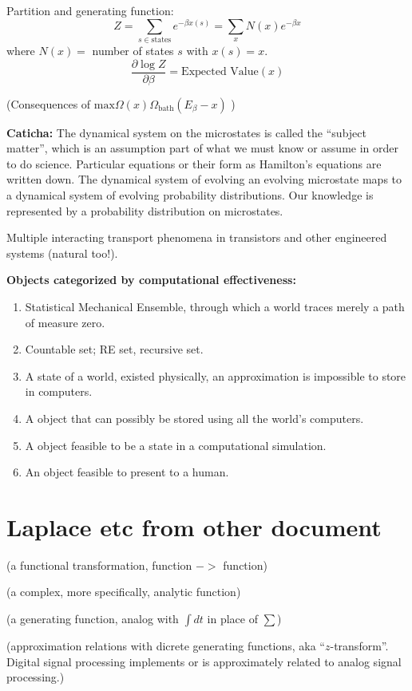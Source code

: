 \documentclass{article}
\begin{document}
Partition and generating function:
\[
Z = \sum_{s\in\text{states}}e^{-\beta x(s)} = \sum_{x}N(x)e^{-\beta x} 
\]
where $N(x)= $ number of states $s$ with $x(s) = x$.
\[
\frac{\partial{\log Z}}{\partial\beta}
=
\text{Expected Value}(x)
\]

(Consequences of $\text{max}\Omega(x)\Omega_{\text{bath}}(E_\beta -x )$
\cite{CatichaEIFP})

\textbf{Caticha:} The dynamical system on the microstates is called
the ``subject matter'', which is an assumption part of what we must know or 
assume
in order to do science.  Particular equations or their form as
Hamilton's equations are written down.
The dynamical system of evolving an evolving 
microstate maps to a dynamical system of evolving probability 
distributions.  Our knowledge is represented by a probability distribution
on microstates.  


Multiple interacting transport phenomena in transistors and other 
engineered systems (natural too!).
 
\textbf{Objects categorized by computational effectiveness:}
\begin{enumerate}
\item Statistical Mechanical Ensemble, through which a world traces
merely a path of measure zero.
\item Countable set; RE set, recursive set.
\item A state of a world, existed physically, an approximation is 
impossible to store in computers.
\item A object that can possibly be stored using all the world's 
computers.
\item A object feasible to be a state in a computational simulation.
\item An object feasible to present to a human.
\end{enumerate}

 



\section{Laplace etc from other document}


(a functional transformation, function $->$ function)

(a complex, more specifically, analytic function)

(a generating function, analog with $\int dt$ in place of $\sum$)

(approximation relations with dicrete generating functions, 
aka ``$z$-transform''. Digital signal processing implements or
is approximately related to analog signal processing.)
\end{document}
